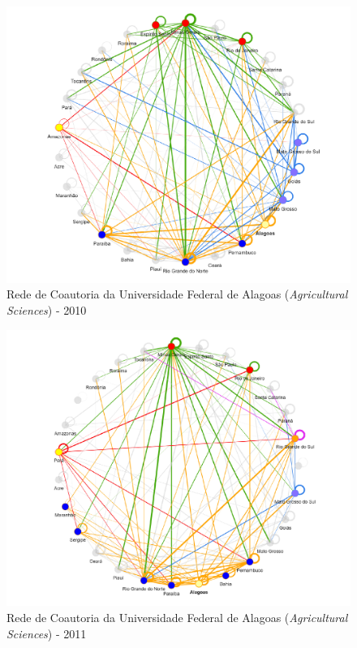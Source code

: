 \begin{figure}[H]
	\centering
	\includegraphics[width=\linewidth]{Imagens/rede-agr-AL-2010.pdf}
	\caption{Rede de Coautoria da Universidade Federal de Alagoas (\textit{Agricultural Sciences}) - 2010}
	\label{Rede de Coautoria - UF AGRI AL 2010}
\end{figure}

\begin{figure}[H]
	\centering
	\includegraphics[width=\linewidth]{Imagens/rede-agr-AL-2011.pdf}
	\caption{Rede de Coautoria da Universidade Federal de Alagoas (\textit{Agricultural Sciences}) - 2011}
	\label{Rede de Coautoria - UF AGRI AL 2011}
\end{figure}


